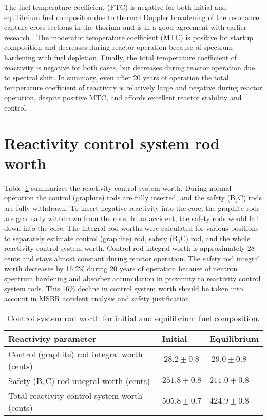 The fuel temperature coefficient (FTC) is negative for both initial and equilibrium fuel compositon due to thermal Doppler broadening of the resonance capture cross sections in the thorium and is in a good agreement with earlier research \cite{robertson_conceptual_1971,park_whole_2015}. The moderator temperature coefficient (MTC) is positive for startup composition and decreases during reactor operation because of spectrum hardening with fuel depletion. Finally, the total temperature coefficient of reactivity is negative for both cases, but decreases during reactor operation due to spectral shift. In summary, even after 20 years of operation the total temperature coefficient of reactivity is relatively large and negative during reactor operation, despite positive MTC, and affords excellent reactor stability and control.

\section{Reactivity control system rod worth}
Table~\ref{tab:rod_worth} summarizes the reactivity control system worth. During normal operation the control (graphite) rods are fully inserted, and the safety (B$_4$C) rods are fully withdrawn. To insert negative reactivity into the core, the graphite rods are gradually withdrawn from the core. In an accident, the safety rods would fall down into the core. The integral rod worths were calculated for various positions to separately estimate control (graphite) rod, safety (B$_4$C) rod, and the whole reactivity control system worth. Control rod integral worth is approximately 28 cents and stays almost constant during reactor operation. The safety rod integral worth decreases by  16.2\% during 20 years of operation because of neutron spectrum hardening and absorber accumulation in proximity to reactivity control system rods. This 16\% decline in control system worth should be taken into account in \gls{MSBR} accident analysis and safety justification.

\begin{table}[hb!]
  \centering
  \caption{Control system rod worth for initial and equilibrium fuel composition.}
\begin{tabular}{| m{} | m{} | m{} |} \hline
\qquad\qquad Reactivity parameter  & \quad Initial      & \enspace Equilibrium      \\[3pt] \hline   
Control (graphite) rod integral worth (cents)               & $\ 28.2\pm0.8$     & $\ 29.0\pm0.8$ \\[3pt]  \hline 
Safety (B$_4$C) rod integral worth (cents)                  & $251.8\pm0.8$    & $211.0\pm0.8$  \\[3pt]  \hline
Total reactivity control system worth (cents)               & $505.8\pm0.7$    & $424.9\pm0.8$ \\[3pt] \hline
\end{tabular}
  \label{tab:rod_worth}
\end{table}


